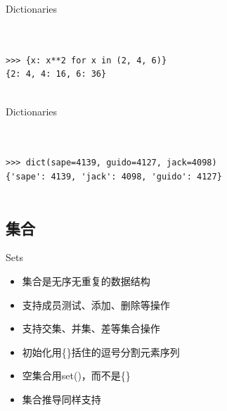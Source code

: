 \documentclass{beamer}
\begin{document}
\begin{frame}[t,fragile]{Dictionaries}


\begin{verbatim}


>>> {x: x**2 for x in (2, 4, 6)}
{2: 4, 4: 16, 6: 36}


\end{verbatim}


\end{frame}




\begin{frame}[t,fragile]{Dictionaries}


\begin{verbatim}


>>> dict(sape=4139, guido=4127, jack=4098)
{'sape': 4139, 'jack': 4098, 'guido': 4127}


\end{verbatim}


\end{frame}
\subsection{集合}
\label{ssub:集合}

\begin{frame}[t]{Sets}

    \begin{itemize}
        \item 集合是无序无重复的数据结构
        \item 支持成员测试、添加、删除等操作
        \item 支持交集、并集、差等集合操作
        \item 初始化用\{\}括住的逗号分割元素序列
        \item 空集合用set()，而不是\{\}
        \item 集合推导同样支持
   \end{itemize}

\end{frame}
\end{document}
